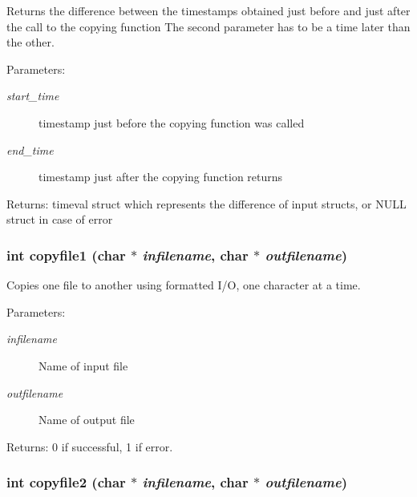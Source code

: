 Returns the difference between the timestamps obtained just before and just after the call to the copying function The second parameter has to be a time later than the other. \begin{Desc}
\item[Parameters:]
\begin{description}
\item[{\em start\_\-time}]timestamp just before the copying function was called \item[{\em end\_\-time}]timestamp just after the copying function returns \end{description}
\end{Desc}
\begin{Desc}
\item[Returns:]timeval struct which represents the difference of input structs, or NULL struct in case of error \end{Desc}
\subsubsection{\setlength{\rightskip}{0pt plus 5cm}int copyfile1 (char $\ast$ {\em infilename}, char $\ast$ {\em outfilename})}\label{cptest1_8c_97d29821b578fd3c9ea2482e77bebfc5}


Copies one file to another using formatted I/O, one character at a time. \begin{Desc}
\item[Parameters:]
\begin{description}
\item[{\em infilename}]Name of input file \item[{\em outfilename}]Name of output file \end{description}
\end{Desc}
\begin{Desc}
\item[Returns:]0 if successful, 1 if error. \end{Desc}
\subsubsection{\setlength{\rightskip}{0pt plus 5cm}int copyfile2 (char $\ast$ {\em infilename}, char $\ast$ {\em outfilename})}\label{cptest1_8c_88b74a1f2a04a2c3e85579164ce6f232}


